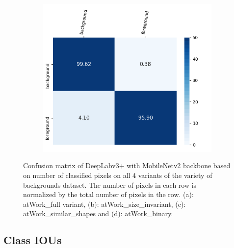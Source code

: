 \begin{figure}
\begin{subfigure}{.3\textwidth}
				\includegraphics[width=1\linewidth]{images/cm_binary}
				\caption{}
			\end{subfigure}
			\caption{Confusion matrix of DeepLabv3+ with MobileNetv2 backbone based on number of classified pixels on all 4 variants of the variety of backgrounds dataset. The number of pixels in each row is normalized by the total number of pixels in the row. (a): atWork\_full variant, (b): atWork\_size\_invariant, (c): atWork\_similar\_shapes and (d): atWork\_binary.}
			\label{Fig:cm}
		\end{figure}
	
	\subsection{Class IOUs}	
	
